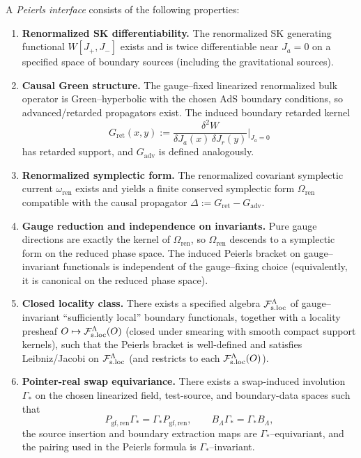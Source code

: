 \begin{definition}
\label{def:2T-cosmo-P}
A \emph{Peierls interface} consists of the following properties:
\begin{enumerate}[label=\textbf{(P\arabic*)},leftmargin=*,itemsep=0.5em]
\item \textbf{Renormalized SK differentiability.} The renormalized SK generating
  functional $W[J_+,J_-]$ exists and is twice differentiable near $J_a=0$ on a
  specified space of boundary sources (including the gravitational sources).
\item \textbf{Causal Green structure.} The gauge--fixed linearized renormalized
  bulk operator is Green--hyperbolic with the chosen AdS boundary conditions, so
  advanced/retarded propagators exist. The induced boundary retarded kernel
  \[
  G_{\mathrm{ret}}(x,y) := \frac{\delta^2 W}{\delta J_a(x)\,\delta J_r(y)}\Big\rvert_{J_a=0}
  \]
  has retarded support, and $G_{\mathrm{adv}}$ is defined analogously.
\item \textbf{Renormalized symplectic form.} The renormalized covariant
  symplectic current $\omega_{\mathrm{ren}}$ exists and yields a finite conserved
  symplectic form $\Omega_{\mathrm{ren}}$ compatible with the causal propagator
  $\Delta:=G_{\mathrm{ret}}-G_{\mathrm{adv}}$.
\item \textbf{Gauge reduction and independence on invariants.} Pure gauge
  directions are exactly the kernel of $\Omega_{\mathrm{ren}}$, so
  $\Omega_{\mathrm{ren}}$ descends to a symplectic form on the reduced phase
  space. The induced Peierls bracket on gauge--invariant functionals is
  independent of the gauge--fixing choice (equivalently, it is canonical on the
  reduced phase space).
\item \textbf{Closed locality class.} There exists a specified algebra
  $\mathcal F_{\mathrm{s.loc}}^\Lambda$ of gauge--invariant ``sufficiently local'' boundary functionals,
  together with a locality presheaf $O\mapsto \mathcal F_{\mathrm{s.loc}}^\Lambda(O)$ (closed under smearing
  with smooth compact support kernels), such that the Peierls bracket is
  well-defined and satisfies Leibniz/Jacobi on $\mathcal F_{\mathrm{s.loc}}^\Lambda$ (and restricts to each
  $\mathcal F_{\mathrm{s.loc}}^\Lambda(O)$).
\item \textbf{Pointer-real swap equivariance.} There exists a swap-induced involution
  $\Gamma_*$ on the chosen linearized field, test-source, and boundary-data spaces such that
  \[
  P_{\mathrm{gf,ren}}\Gamma_*=\Gamma_*P_{\mathrm{gf,ren}},
  \qquad
  B_\Lambda\Gamma_*=\Gamma_*B_\Lambda,
  \]
  the source insertion and boundary extraction maps are $\Gamma_*$--equivariant,
  and the pairing used in the Peierls formula is $\Gamma_*$--invariant.
\end{enumerate}
\end{definition}

